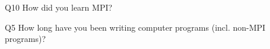 \begin{description}%
\item{Q10} How did you learn MPI?%
\item{Q5} How long have you been writing computer programs (incl. non-MPI programs)?%
\end{description}%

